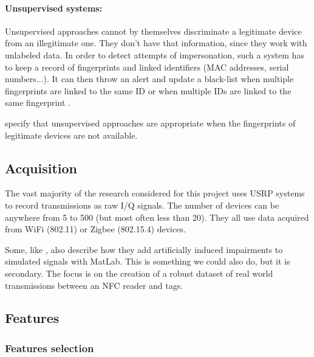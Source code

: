 \paragraph{Unsupervised systems:} Unsupervised approaches cannot by themselves discriminate a legitimate device from an illegitimate one. They don't have that information, since they work with unlabeled data. In order to detect attempts of impersonation, such a system has to keep a record of fingerprints and linked identifiers (MAC addresses, serial numbers...). It can then throw an alert and update a black-list when multiple fingerprints are linked to the same ID or when multiple IDs are linked to the same fingerprint \cite{xu_device_2015, nguyen_device_2011}.

\textcite{xu_device_2015} specify that unsupervised approaches are appropriate when the fingerprints of legitimate devices are not available.

\subsection{Acquisition}

The vast majority of the research considered for this project uses USRP systems to record transmissions as raw I/Q signals. The number of devices can be anywhere from 5 to 500 (but most often less than 20). They all use data acquired from WiFi (802.11) or Zigbee (802.15.4) devices. \cite{riyaz_deep_2018, oyedare_estimating_2019, youssef_machine_2017, morin_transmitter_2019, sankhe_no_2019, nguyen_device_2011}

Some, like \textcite{sankhe_no_2019}, also describe how they add artificially induced impairments to simulated signals with MatLab. This is something we could also do, but it is secondary. The focus is on the creation of a robust dataset of real world transmissions between an NFC reader and tags.

\subsection{Features}

\subsubsection{Features selection}

